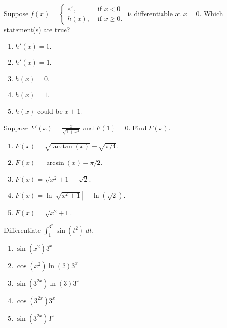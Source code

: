 \documentclass[../main.tex]{subfiles}
\begin{document}
\vfill{}
\clearpage

\begin{exercise}
  Suppose \(f(x) = \begin{cases} e^{x}, &\text{ if } x < 0 \\ h(x),&\text{ if } x \ge 0. \end{cases}\) is differentiable at \(x = 0\). Which statement(s) \uline{are} true?

  \begin{enumerate}[label=\Alph*.]
    \item \(h'(x) = 0\).
    \item \(h'(x) = 1\).
    \item \(h(x) = 0\).
    \item \(h(x) = 1\).
    \item \(h(x)\) could be \(x+1\).
  \end{enumerate}
\end{exercise}
\vfill{}


\begin{exercise}
  Suppose \(F'(x) = \frac{x}{\sqrt{1+x^{2}}}\) and \(F(1) = 0\). Find \(F(x)\).

  \begin{enumerate}[label=\Alph*.]
    \item \(F(x) = \sqrt{\arctan(x)} - \sqrt{\pi/4}\).
    \item \(F(x) = \arcsin(x) - \pi/2\).
    \item \(F(x) = \sqrt{x^{2} + 1} - \sqrt{2}\).
    \item \(F(x) = \ln\left|\sqrt{x^{2} + 1}\right| - \ln(\sqrt{2})\).
    \item \(F(x) = \sqrt{x^{2} + 1}\).
  \end{enumerate}
\end{exercise}

\vfill{}

\begin{exercise}
  Differentiate \(\int_{1}^{3^{x}} \sin(t^{2})\;dt \).

  \begin{enumerate}[label=\Alph*.]
    \item \(\sin(x^{2})3^{x}\)
    \item \(\cos(x^{2})\ln(3)3^{x}\)
    \item \(\sin(3^{2x})\ln(3)3^{x}\)
    \item \(\cos(3^{2x})3^{x}\)
    \item \(\sin(3^{2x})3^{x}\)
  \end{enumerate}
\end{exercise}
\end{document}
